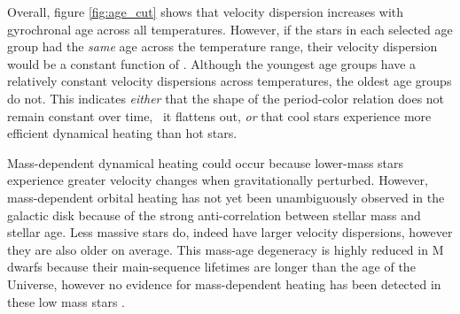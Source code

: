 Overall, figure \ref{fig:age_cut} shows that velocity dispersion increases
with gyrochronal age across all temperatures.
However, if the stars in each selected age group had the {\it same} age across
the temperature range, their velocity dispersion would be a constant function
of \teff.
Although the youngest age groups have a relatively constant velocity
dispersions across temperatures, the oldest age groups do not.
This indicates {\it either} that the shape of the period-color relation does
not remain constant over time, \ie\ it flattens out, {\it or} that cool stars
experience more efficient dynamical heating than hot stars.

Mass-dependent dynamical heating could occur because lower-mass stars
experience greater velocity changes when gravitationally perturbed.
However, mass-dependent orbital heating has not yet been unambiguously
observed in the galactic disk because of the strong anti-correlation between
stellar mass and stellar age.
Less massive stars do, indeed have larger velocity dispersions, however they
are also older on average.
This mass-age degeneracy is highly reduced in M dwarfs because their
main-sequence lifetimes are longer than the age of the Universe, however no
evidence for mass-dependent heating has been detected in these low mass stars
\citep{faherty2009}.

